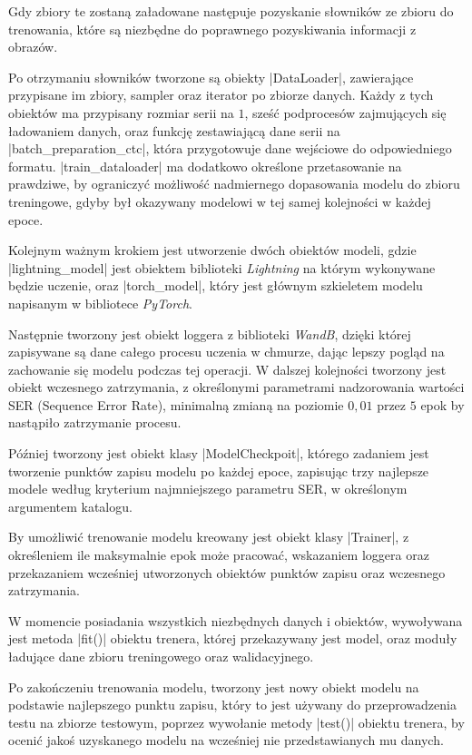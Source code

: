 Gdy zbiory te zostaną załadowane następuje pozyskanie słowników ze zbioru do trenowania, które są niezbędne do poprawnego pozyskiwania informacji z obrazów.

Po otrzymaniu słowników tworzone są obiekty \pyth|DataLoader|, zawierające przypisane im zbiory, sampler oraz iterator po zbiorze danych. Każdy z tych obiektów ma przypisany rozmiar serii na $1$, sześć podprocesów zajmujących się ładowaniem  danych, oraz funkcję zestawiającą dane serii na \pyth|batch_preparation_ctc|, która przygotowuje dane wejściowe do odpowiedniego formatu. \pyth|train_dataloader| ma dodatkowo określone przetasowanie na prawdziwe, by ograniczyć możliwość nadmiernego dopasowania modelu do zbioru treningowe, gdyby był okazywany modelowi w tej samej kolejności w każdej epoce.

Kolejnym ważnym krokiem jest utworzenie dwóch obiektów modeli, gdzie \pyth|lightning_model| jest obiektem biblioteki \textit{Lightning} na którym wykonywane będzie uczenie, oraz \pyth|torch_model|, który jest głównym szkieletem modelu napisanym w bibliotece \textit{PyTorch}.

Następnie tworzony jest obiekt loggera z biblioteki \textit{WandB}, dzięki której zapisywane są dane całego procesu uczenia w chmurze, dając lepszy pogląd na zachowanie się modelu podczas tej operacji. W dalszej kolejności tworzony jest obiekt wczesnego zatrzymania, z określonymi parametrami nadzorowania wartości SER (Sequence Error Rate), minimalną zmianą na poziomie $0,01$ przez $5$ epok by nastąpiło zatrzymanie procesu.

Później tworzony jest obiekt klasy \pyth|ModelCheckpoit|, którego zadaniem jest tworzenie punktów zapisu modelu po każdej epoce, zapisując trzy najlepsze modele według kryterium najmniejszego parametru SER, w określonym argumentem katalogu.

By umożliwić trenowanie modelu kreowany jest obiekt klasy \pyth|Trainer|, z określeniem ile maksymalnie epok może pracować, wskazaniem loggera oraz przekazaniem wcześniej utworzonych obiektów punktów zapisu oraz wczesnego zatrzymania.

W momencie posiadania wszystkich niezbędnych danych i obiektów, wywoływana jest metoda \pyth|fit()| obiektu trenera, której przekazywany jest model, oraz moduły ładujące dane zbioru treningowego oraz walidacyjnego.

Po zakończeniu trenowania modelu, tworzony jest nowy obiekt modelu na podstawie najlepszego punktu zapisu, który to jest używany do przeprowadzenia testu na zbiorze testowym, poprzez wywołanie metody \pyth|test()| obiektu trenera, by ocenić jakoś uzyskanego modelu na wcześniej nie przedstawianych mu danych.